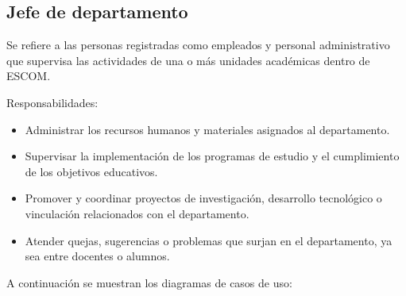 \begin{Usuario}{\hypertarget{tJefe}{\subsection{Jefe de departamento}}}{
	Se refiere a las personas registradas como empleados y personal administrativo que supervisa las actividades de una o más unidades académicas dentro de ESCOM.
}
\item[Responsabilidades:] \cdtEmpty
\begin{itemize}

	\item Administrar los recursos humanos y materiales asignados al departamento.
	\item Supervisar la implementación de los programas de estudio y el cumplimiento de los objetivos educativos.
	\item Promover y coordinar proyectos de investigación, desarrollo tecnológico o vinculación relacionados con el departamento.
	\item Atender quejas, sugerencias o problemas que surjan en el departamento, ya sea entre docentes o alumnos.
\end{itemize}

\end{Usuario}

A continuación se muestran los diagramas de casos de uso:

